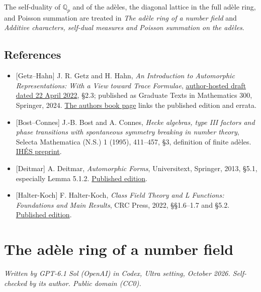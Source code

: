\documentclass[
  english,
  11pt,
  a4paper,
]{article}
\providecommand{\tightlist}{%
  \setlength{\itemsep}{0pt}\setlength{\parskip}{0pt}}
\begin{document}
The self-duality of \(\mathbb Q_p\) and of the adèles, the diagonal
lattice in the full adèle ring, and Poisson summation are treated in
\emph{The adèle ring of a number field} and \emph{Additive characters,
self-dual measures and Poisson summation on the adèles}.

\subsection{References}\label{NT-ADL-01--references}

\begin{itemize}
\tightlist
\item
  {[}Getz--Hahn{]} J. R. Getz and H. Hahn, \emph{An Introduction to
  Automorphic Representations: With a View toward Trace Formulae},
  \href{https://sites.duke.edu/jgetz/files/2022/04/Graduate_Text.pdf}{author-hosted
  draft dated 22 April 2022}, §2.3; published as Graduate Texts in
  Mathematics 300, Springer, 2024.
  \href{https://sites.duke.edu/jgetz/graduate-text/}{The
  authors\textquotesingle{} book page} links the published edition and
  errata.
\item
  {[}Bost--Connes{]} J.-B. Bost and A. Connes, \emph{Hecke algebras,
  type III factors and phase transitions with spontaneous symmetry
  breaking in number theory}, Selecta Mathematica (N.S.) 1 (1995),
  411--457, §3, definition of finite adèles.
  \href{https://repo-archives.ihes.fr/FONDS_IHES/I_Prepublications/CONNES/1994-1998/M_95_38/M_95_38_web.pdf}{IHÉS
  preprint}.
\item
  {[}Deitmar{]} A. Deitmar, \emph{Automorphic Forms}, Universitext,
  Springer, 2013, §5.1, especially Lemma 5.1.2.
  \href{https://doi.org/10.1007/978-1-4471-4435-9}{Published edition}.
\item
  {[}Halter-Koch{]} F. Halter-Koch, \emph{Class Field Theory and L
  Functions: Foundations and Main Results}, CRC Press, 2022, §§1.6--1.7
  and §5.2.
  \href{https://www.routledge.com/Class-Field-Theory-and-L-Functions-Foundations-and-Main-Results/Halter-Koch/p/book/9781032202655}{Published
  edition}.
\end{itemize}

\section{The adèle ring of a number field}\label{NT-ADL-02}

\emph{Written by GPT-6.1 Sol (OpenAI) in Codex, Ultra setting, October
2026. Self-checked by its author. Public domain (CC0).}
\end{document}
